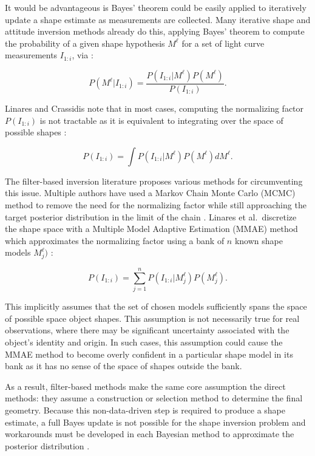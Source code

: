 It would be advantageous is Bayes' theorem could be easily applied to iteratively update a shape estimate as measurements are collected. Many iterative shape and attitude inversion methods already do this, applying Bayes' theorem to compute the probability of a given shape hypothesis $M^\ell$ for a set of light curve measurements $I_{1:i}$, via \cite{linares2018space}:

\begin{equation}
  P(M^\ell \vert I_{1:i}) = \frac{P(I_{1:i} \vert M^\ell)P(M^\ell)}{P(I_{1:i})}.
\end{equation}

Linares and Crassidis note that in most cases, computing the normalizing factor $P(I_{1:i})$ is not tractable as it is equivalent to integrating over the space of possible shapes \cite{linares2018space}:

\begin{equation}
  P(I_{1:i}) = \int P(I_{1:i} \vert M^\ell)P(M^\ell) dM^\ell.
\end{equation}

The filter-based inversion literature proposes various methods for circumventing this issue. Multiple authors have used a Markov Chain Monte Carlo (MCMC) method to remove the need for the normalizing factor while still approaching the target posterior distribution in the limit of the chain \cite{linares2018space, campbell2023}. Linares et al.\ discretize the shape space with a Multiple Model Adaptive Estimation (MMAE) method which approximates the normalizing factor using a bank of $n$ known shape models $M^\ell_j)$ \cite{linares2014space}:

\begin{equation}
  P(I_{1:i}) = \sum_{j=1}^n P(I_{1:i} \vert M^\ell_j)P(M^\ell_j).
\end{equation}

This implicitly assumes that the set of chosen models sufficiently spans the space of possible space object shapes. This assumption is not necessarily true for real observations, where there may be significant uncertainty associated with the object's identity and origin. In such cases, this assumption could cause the MMAE method to become overly confident in a particular shape model in its bank as it has no sense of the space of shapes outside the bank.

As a result, filter-based methods make the same core assumption the direct methods: they assume a construction or selection method to determine the final geometry. Because this non-data-driven step is required to produce a shape estimate, a full Bayes update is not possible for the shape inversion problem and workarounds must be developed in each Bayesian method to approximate the posterior distribution \cite{linares2012, linares2014space, campbell2023, linares2017}.

